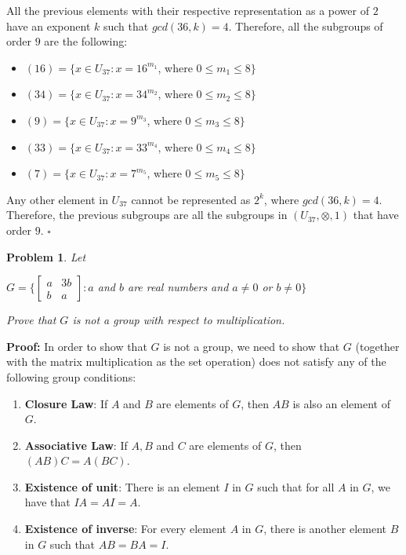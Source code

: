 \documentclass[a4paper,openany,11pt]{book}
\newtheorem{Prob}{Problem}
\begin{document}
All the previous elements with their respective representation as a power of $2$ have an exponent $k$ such that $gcd(36,k) = 4$. Therefore, all the subgroups of order $9$ are the following:

\begin{itemize}
	\item $(16) = \lbrace x \in U_{37}: x = 16^{m_{1}}$, where $0 \leq m_{1} \leq 8 \rbrace$
	
	\item $(34) = \lbrace x \in U_{37}: x = 34^{m_{2}}$, where $0 \leq m_{2} \leq 8 \rbrace$
	
	\item $(9) = \lbrace x \in U_{37}: x = 9^{m_{3}}$, where $0 \leq m_{3} \leq 8 \rbrace$
	
	\item $(33) = \lbrace x \in U_{37}: x = 33^{m_{4}}$, where $0 \leq m_{4} \leq 8 \rbrace$
	
	\item $(7) = \lbrace x \in U_{37}: x = 7^{m_{5}}$, where $0 \leq m_{5} \leq 8 \rbrace$
\end{itemize}

Any other element in $U_{37}$ cannot be represented as $2^{k}$, where $gcd(36,k) = 4$. Therefore, the previous subgroups are all the subgroups in $(U_{37}, \otimes, 1)$ that have order $9$. \hspace{0.1cm} $\square$

\begin{Prob}
	Let
	
	\begin{center}
		$G = \biggl\{\left[\begin{array}{cc}
		a & 3b\\
		b & a
		\end{array}\right] : a$ and $b$ are real numbers and $a\neq 0$ or $b \neq 0\biggr\} $
	\end{center}

	Prove that $G$ is not a group with respect to multiplication.

\end{Prob}

\textbf{Proof:} In order to show that $G$ is not a group, we need to show that $G$ (together with the matrix multiplication as the set operation) does not satisfy any of the following group conditions:

\begin{enumerate}
	\item \textbf{Closure Law}: If $A$ and $B$ are elements of $G$, then $AB$ is also an element of $G$. 
	
	\item \textbf{Associative Law}: If $A, B$ and $C$ are elements of $G$, then $(AB)C = A(BC)$.
	
	\item \textbf{Existence of unit}: There is an element $I$ in $G$ such that for all $A$ in $G$, we have that $IA = AI = A$.
	
	\item \textbf{Existence of inverse}: For every element $A$ in $G$, there is another element $B$ in $G$ such that $AB = BA = I$.
\end{enumerate} 
\end{document}
